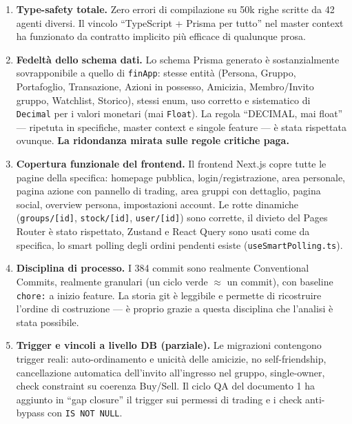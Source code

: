 \documentclass[11pt,a4paper]{article}
\newcommand{\file}[1]{\texttt{\small #1}}
\begin{document}
\begin{enumerate}[leftmargin=1.8em]
  \item \textbf{Type-safety totale.} Zero errori di compilazione su 50k righe scritte da 42 agenti diversi. Il vincolo ``TypeScript + Prisma per tutto'' nel master context ha funzionato da contratto implicito pi\`u efficace di qualunque prosa.

  \item \textbf{Fedelt\`a dello schema dati.} Lo schema Prisma generato \`e sostanzialmente sovrapponibile a quello di \file{finApp}: stesse entit\`a (Persona, Gruppo, Portafoglio, Transazione, Azioni in possesso, Amicizia, Membro/Invito gruppo, Watchlist, Storico), stessi enum, uso corretto e sistematico di \file{Decimal} per i valori monetari (mai \file{Float}). La regola ``DECIMAL, mai float'' --- ripetuta in specifiche, master context e singole feature --- \`e stata rispettata ovunque. \textbf{La ridondanza mirata sulle regole critiche paga.}

  \item \textbf{Copertura funzionale del frontend.} Il frontend Next.js copre tutte le pagine della specifica: homepage pubblica, login/registrazione, area personale, pagina azione con pannello di trading, area gruppi con dettaglio, pagina social, overview persona, impostazioni account. Le rotte dinamiche (\file{groups/[id]}, \file{stock/[id]}, \file{user/[id]}) sono corrette, il divieto del Pages Router \`e stato rispettato, Zustand e React Query sono usati come da specifica, lo smart polling degli ordini pendenti esiste (\file{useSmartPolling.ts}).

  \item \textbf{Disciplina di processo.} I 384 commit sono realmente Conventional Commits, realmente granulari (un ciclo verde $\approx$ un commit), con baseline \file{chore:} a inizio feature. La storia git \`e leggibile e permette di ricostruire l'ordine di costruzione --- \`e proprio grazie a questa disciplina che l'analisi \`e stata possibile.

  \item \textbf{Trigger e vincoli a livello DB (parziale).} Le migrazioni contengono trigger reali: auto-ordinamento e unicit\`a delle amicizie, no self-friendship, cancellazione automatica dell'invito all'ingresso nel gruppo, single-owner, check constraint su coerenza Buy/Sell. Il ciclo QA del documento 1 ha aggiunto in ``gap closure'' il trigger sui permessi di trading e i check anti-bypass con \file{IS NOT NULL}.


\end{enumerate}
\end{document}
